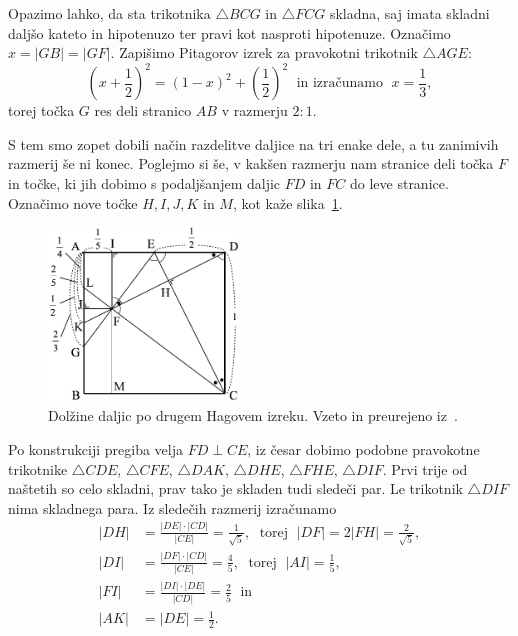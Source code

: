 \begin{dokaz}
    Opazimo lahko, da sta trikotnika $\triangle BCG$ in $\triangle FCG$ skladna, saj imata skladni daljšo kateto in hipotenuzo ter pravi kot nasproti hipotenuze. Označimo $x = |GB| = |GF|$. Zapišimo Pitagorov izrek za pravokotni trikotnik $\triangle AGE$:
    $$ \left(x + \frac{1}{2}\right)^2 = (1-x)^2 + \left(\frac{1}{2}\right)^2 \; \text{ in izračunamo } \; x = \frac{1}{3},$$
    torej točka $G$ res deli stranico $AB$ v razmerju $2:1$.
\end{dokaz}

S tem smo zopet dobili način razdelitve daljice na tri enake dele, a tu zanimivih razmerij še ni konec. Poglejmo si še, v kakšen razmerju nam stranice deli točka $F$ in točke, ki jih dobimo s podaljšanjem daljic $FD$ in $FC$ do leve stranice. Označimo nove točke $H, I, J, K$ in $M$, kot kaže slika~\ref{fig:hagov_izrek2_st}.

\begin{figure}[h]
    \centering
    \includegraphics[width=0.45\textwidth]{images/hagovi_izreki/hagov_izrek2_stevilke.png}
    \caption[Drugi Hagov izrek v številkah]{Dolžine daljic po drugem Hagovem izreku. Vzeto in preurejeno iz~\cite[str. 15]{haga2008}.}
    \label{fig:hagov_izrek2_st}
\end{figure}

Po konstrukciji pregiba velja $FD \perp CE$, iz česar dobimo podobne pravokotne trikotnike $\triangle CDE$, $\triangle CFE$, $\triangle DAK$, $\triangle DHE$, $\triangle FHE$, $\triangle DIF$. Prvi trije od naštetih so celo skladni, prav tako je skladen tudi sledeči par. Le trikotnik $\triangle DIF$ nima skladnega para. Iz sledečih razmerij izračunamo
\begin{align*}
    |DH| &= \frac{|DE| \cdot |CD|}{|CE|} = \frac{1}{\sqrt{5}}, \; \text{ torej } \; |DF| = 2|FH| = \frac{2}{\sqrt{5}}, \\
    |DI| &= \frac{|DF| \cdot |CD|}{|CE|} = \frac{4}{5}, \; \text{ torej } \; |AI| = \frac{1}{5}, \\
    |FI| &= \frac{|DI| \cdot |DE|}{|CD|} = \frac{2}{5} \; \text{ in} \\
    |AK| &= |DE| = \frac{1}{2}.
\end{align*}

